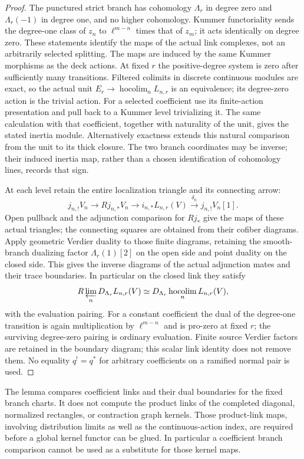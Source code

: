 \documentclass[11pt]{article}
\theoremstyle{definition}
\theoremstyle{remark}
\begin{document}
\begin{proof}
The punctured strict branch has cohomology $\Lambda_r$ in degree
zero and $\Lambda_r(-1)$ in degree one, and no higher cohomology.
Kummer functoriality sends the degree-one class of $z_n$ to
$\ell^{m-n}$ times that of $z_m$; it acts identically on degree zero.
These statements identify the maps of the actual link complexes,
not an arbitrarily selected splitting.  The maps are induced by
the same Kummer morphisms as the deck actions.  At fixed $r$ the
positive-degree system is zero after sufficiently many transitions.
Filtered colimits in discrete continuous modules are exact, so the
actual unit $E_r\to\operatorname*{hocolim}_n L_{n,r}$ is an
equivalence; its degree-zero action is the trivial action.
For a selected coefficient use its finite-action presentation and
pull back to a Kummer level trivializing it.  The same calculation
with that coefficient, together with naturality of the unit, gives
the stated inertia module.  Alternatively exactness extends this
natural comparison from the unit to its thick closure.  The two
branch coordinates may be inverse; their induced inertia map,
rather than a chosen identification of cohomology lines, records
that sign.

At each level retain the entire localization triangle and its
connecting arrow:
\[
 j_{n,!}V_n\longrightarrow Rj_{n,*}V_n
   \longrightarrow i_{n,*}L_{n,r}(V)
   \xrightarrow{\delta_n}j_{n,!}V_n[1].
\]
Open pullback and the adjunction comparison for $Rj_*$ give the
maps of these actual triangles; the connecting squares are obtained
from their cofiber diagrams.  Apply geometric Verdier duality to
those finite diagrams, retaining the smooth-branch dualizing factor
$\Lambda_r(1)[2]$ on the open side and point duality on the closed
side.  This gives the inverse diagrams of the actual adjunction
mates and their trace boundaries.  In particular on the closed
link they satisfy
\[
 R\varprojlim_n D_{\Lambda_r}L_{n,r}(V)
  \simeq D_{\Lambda_r}\operatorname*{hocolim}_nL_{n,r}(V),
\]
with the evaluation pairing.  For a constant coefficient the dual
of the degree-one transition is again multiplication by
$\ell^{m-n}$ and is pro-zero at fixed $r$; the surviving degree-zero
pairing is ordinary evaluation.  Finite source Verdier factors are
retained in the boundary diagram; this scalar link identity does
not remove them.  No equality $q^!=q^*$ for arbitrary coefficients
on a ramified normal pair is used.
\end{proof}

The lemma compares coefficient links and their dual boundaries for
the fixed branch charts.  It does not compute the product links of
the completed diagonal, normalized rectangles, or contraction graph
kernels.  Those product-link maps, involving distribution limits as
well as the continuous-action index, are required before a global
kernel functor can be glued.  In particular a coefficient branch
comparison cannot be used as a substitute for those kernel maps.
\end{document}
